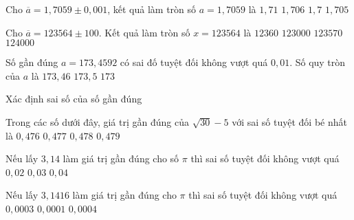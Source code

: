 \begin{ex}%
	Cho  $ \overline{a} = 1{,}7059\pm 0{,}001$, kết quả làm tròn số $ a = 1{,}7059 $ là
	\choice
	{\True $ 1{,}71$}
	{ $ 1{,}706 $}
	{ $ 1{,}7 $}
	{ $ 1{,}705 $}
\end{ex}

\begin{ex}%
	Cho $ \overline{a} = 123564\pm 100$. Kết quả làm tròn số $ x = 123564 $ là
	\choice
	{$12360 $}
	{ $ 123000 $}
	{ $ 123570 $}
	{\True  $ 124000 $}
\end{ex}

\begin{ex}%
	Số gần đúng $a = 173{,}4592$ có sai đố tuyệt đối không vượt quá $0{,}01$. Số quy tròn của $a$ là 
	{$173{,}46$}
	{\True $173{,}5$}
	{$173$}
\end{ex}

\begin{dang}
	{Xác định sai số của số gần đúng}
\end{dang}

\begin{ex}%
	Trong các số dưới đây, giá trị gần đúng của $\sqrt{30}-5$ với sai số tuyệt đối bé nhất là
	\choice
	{$0{,}476$}
	{\True $0{,}477$}
	{$0{,}478$}
	{$0{,}479$}
\end{ex}

\begin{ex}%
	Nếu lấy $3{,}14$ làm giá trị gần đúng cho số $\pi$ thì sai số tuyệt đối không vượt quá  
	{$0{,}02$}
	{$0{,}03$}
	{$0{,}04$}
	
\end{ex}
\begin{ex}%
	Nếu lấy $3,1416$ làm giá trị gần đúng cho $\pi$ thì sai số tuyệt đối không vượt quá 
	{$0, 0003$}
	{\True $0, 0001$}
	{$0, 0004$}
\end{ex}


